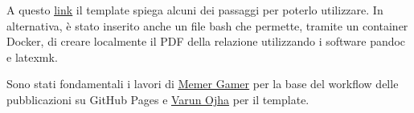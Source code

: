 A questo \href{https://github.com/mega2799/Report-ghPages-latex}{\underline{link}} il template spiega alcuni dei passaggi per poterlo utilizzare. In alternativa, è stato inserito anche un file bash che permette, tramite un container Docker, di creare localmente il PDF della relazione utilizzando i software pandoc e latexmk.

Sono stati fondamentali i lavori di \href{https://github.com/MemerGamer/LaTex-Publishing}{\underline{Memer Gamer}} per la base del workflow delle pubblicazioni su GitHub Pages e \href{https://www.overleaf.com/latex/templates/university-of-reading-computer-science-report-template-and-guide/xhttddjhkwrf}{\underline{Varun Ojha}} per il template.




